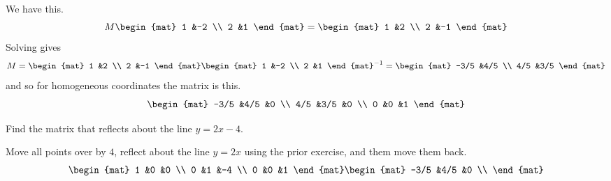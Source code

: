 \begin{exercises}
\begin{answer}
      We have this.
      \begin{equation*}
        M
        \begin{mat}
          1  &-2  \\
          2  &1
        \end{mat}
        =
        \begin{mat}
          1  &2  \\
          2  &-1
        \end{mat}
      \end{equation*}
      Solving gives
      \begin{equation*}
        M =
            \begin{mat}
              1  &2  \\
              2  &-1
            \end{mat}
            \begin{mat}
              1  &-2  \\
              2  &1     
            \end{mat}^{-1}
          =
            \begin{mat}
              -3/5  &4/5 \\
              4/5   &3/5
            \end{mat}
      \end{equation*}
      and so for homogeneous coordinates the matrix is this.
      \begin{equation*}
      \begin{mat}
        -3/5  &4/5  &0  \\
         4/5  &3/5  &0  \\
           0  &0    &1
      \end{mat}
      \end{equation*}
    \end{answer}
  \item Find the matrix that reflects about the line $y=2x-4$.
    \begin{answer}
      Move all points over by $4$, reflect about the line $y=2x$ using the
      prior exercise, and them move them back. 
      \begin{equation*}
      \begin{mat}
        1  &0  &0  \\
        0  &1  &-4 \\
        0  &0  &1
      \end{mat}
      \begin{mat}
        -3/5  &4/5  &0  \\

\end{mat}
\end{equation*}
\end{answer}
\end{exercises}
